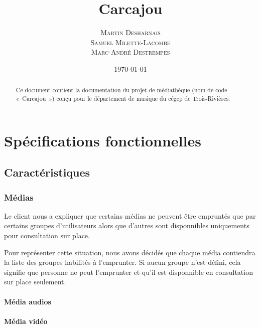 \documentclass[letter, 11pt]{report}
\begin{document}
\title{Carcajou}
\author{\textsc{Martin Desharnais} \\ \textsc{Samuel Milette-Lacombe} \\ \textsc{Marc-André Destrempes}}
\date{\today}

\maketitle

\begin{abstract}
Ce document contient la documentation du projet de médiathèque (nom de code «~Carcajou~») conçu pour le département de musique du cégep de Trois-Rivières.
\end{abstract}

\newpage
\tableofcontents
\newpage

\chapter{Spécifications fonctionnelles}

\section{Caractéristiques}

\subsection{Médias}

Le client nous a expliquer que certains médias ne peuvent être empruntés que par certains groupes d'utilisateurs alors que d'autres sont disponnibles uniquements pour consultation sur place.

Pour représenter cette situation, nous avons décidés que chaque média contiendra la liste des groupes habilités à l'emprunter. Si aucun groupe n'est défini, cela signifie que personne ne peut l'emprunter et qu'il est disponnible en consultation sur place seulement.

\subsubsection{Média audios}

\subsubsection{Média vidéo}
\end{document}
